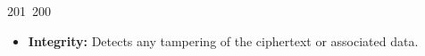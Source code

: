 201~200~\documentclass{article}
\begin{document}
\begin{itemize}
	                                                                                                                                                                                                                                                                                                	                                                                                                                                        	    	                                                                                                	                                                                                                                                                                                                                                                                                                                                	                                                                        	                                                                        	                                                                                                                                        	                                                                                                                                                                                                                        	                                                                                                                            	                                                                	                                                                                                                                                                                            \item \textbf{Integrity:} Detects any tampering of the ciphertext or associated data.

\end{itemize}
\end{document}
